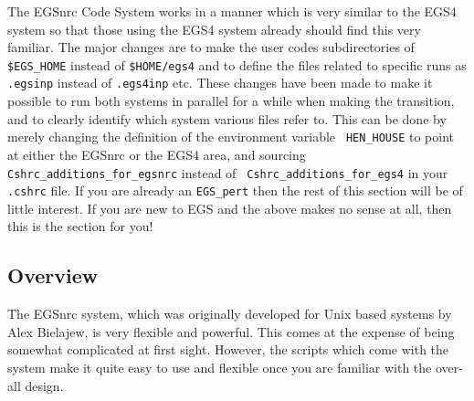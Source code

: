   
The EGSnrc Code System works in a manner which is very similar to the EGS4
system so that those using the EGS4 system already should find this very
familiar.  The major changes are to make 
the user codes subdirectories of \verb+$EGS_HOME+ instead of  \verb+$HOME/egs4+ and to
define the files related to specific runs as \verb+.egsinp+ instead of
\verb+.egs4inp+ etc.  These changes have been made to make it possible to
run both systems in parallel for a while when making the transition, and to
clearly identify which system various files refer to.  This can be done by
merely changing the definition  of the environment variable {\tt
HEN\_HOUSE} to point at either the EGSnrc or the EGS4 area,
and sourcing {\tt Cshrc\_additions\_for\_egsnrc} instead of {\tt
Cshrc\_additions\_for\_egs4} in your {\tt .cshrc} file. If you are already
an \verb+EGS_pert+ then the rest of this section will be of little
interest.  If you are new to EGS and the above makes no sense at all, then
this is the section for you!


\subsection{Overview}

The EGSnrc system, which was originally developed for Unix based systems by
Alex Bielajew, is very flexible and powerful.  This comes at the expense of
being somewhat complicated at first sight.  However, the scripts which come
with the system make it quite easy to use and flexible once you are familiar
with the over-all design. 

